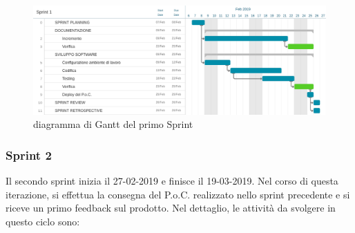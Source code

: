 \begin{figure}[htbp]
	\centering
	\includegraphics[width=15cm,keepaspectratio]{../includes/pics/grafici/Sprint_1.jpeg}
	\caption{\label{fig:gantt-sprint1}diagramma di Gantt del primo Sprint}
\end{figure}

\clearpage
\subsubsection{Sprint 2}
Il secondo sprint inizia il 27-02-2019 e finisce il 19-03-2019. Nel corso di questa iterazione, si effettua la consegna del P.o.C. realizzato nello sprint precedente e si riceve un primo feedback sul prodotto.
Nel dettaglio, le attività da svolgere in questo ciclo sono:
